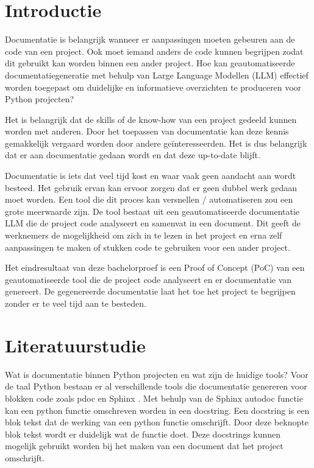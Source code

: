 
\section{Introductie}%
\label{sec:introductie}

Documentatie is belangrijk wanneer er aanpassingen moeten gebeuren aan de code van een project.
Ook moet iemand anders de code kunnen begrijpen zodat dit gebruikt kan worden binnen een ander project.
Hoe kan geautomatiseerde documentatiegeneratie met behulp van Large Language Modellen (LLM) effectief worden toegepast om duidelijke en informatieve overzichten te produceren voor Python projecten?

Het is belangrijk dat de skills of de know-how van een project gedeeld kunnen worden met anderen. 
Door het toepassen van documentatie kan deze kennis gemakkelijk vergaard worden door andere geïnteresseerden.
Het is dus belangrijk dat er aan documentatie gedaan wordt en dat deze up-to-date blijft. 

Documentatie is iets dat veel tijd kost en waar vaak geen aandacht aan wordt besteed.
Het gebruik ervan kan ervoor zorgen dat er geen dubbel werk gedaan moet worden. Een tool die dit proces kan versnellen / automatiseren zou een grote meerwaarde zijn.
De tool bestaat uit een geautomatiseerde documentatie LLM die de project code analyseert en samenvat in een document. 
Dit geeft de werknemers de mogelijkheid om zich in te lezen in het project en erna zelf aanpassingen te maken of stukken code te gebruiken voor een ander project.

Het eindresultaat van deze bachelorproef is een Proof of Concept (PoC) van een geautomatiseerde tool die de project code analyseert en er documentatie van genereert.
De gegenereerde documentatie laat het toe het project te begrijpen zonder er te veel tijd aan te besteden.


\section{Literatuurstudie}%
\label{sec:Literatuurstudie}

Wat is documentatie binnen Python projecten en wat zijn de huidige tools?
Voor de taal Python bestaan er al verschillende tools die documentatie genereren voor blokken code zoals pdoc \autocite{GallantHils2023} en Sphinx \autocite{Sphinx2023}. 
Met behulp van de Sphinx autodoc functie \autocite{Sphinx2023} kan een python functie omschreven worden in een docstring.
Een docstring is een blok tekst dat de werking van een python functie omschrijft. Door deze beknopte blok tekst wordt er duidelijk wat de functie doet.
Deze docstrings kunnen mogelijk gebruikt worden bij het maken van een document dat het project omschrijft.

